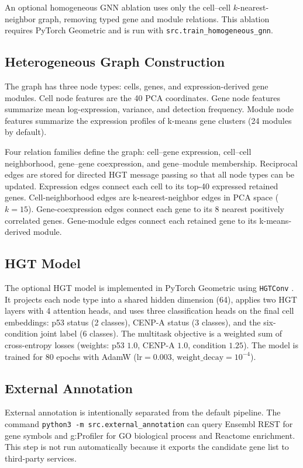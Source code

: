 An optional homogeneous GNN ablation uses only the cell--cell $k$-nearest-neighbor
graph, removing typed gene and module relations.
This ablation requires PyTorch Geometric and is run with
\texttt{src.train\_homogeneous\_gnn}.

\subsection{Heterogeneous Graph Construction}

The graph has three node types: cells, genes, and expression-derived gene modules.
Cell node features are the 40 PCA coordinates.
Gene node features summarize mean log-expression, variance, and detection frequency.
Module node features summarize the expression profiles of k-means gene clusters
(24 modules by default).

Four relation families define the graph: cell--gene expression, cell--cell
neighborhood, gene--gene coexpression, and gene--module membership.
Reciprocal edges are stored for directed HGT message passing so that all node
types can be updated.
Expression edges connect each cell to its top-40 expressed retained genes.
Cell-neighborhood edges are k-nearest-neighbor edges in PCA space ($k=15$).
Gene-coexpression edges connect each gene to its 8 nearest positively correlated
genes.
Gene-module edges connect each retained gene to its k-means-derived module.

\subsection{HGT Model}

The optional HGT model is implemented in PyTorch Geometric using \texttt{HGTConv}
\citep{pyg_hgtconv,pyg_heterodata}.
It projects each node type into a shared hidden dimension (64), applies two HGT
layers with 4 attention heads, and uses three classification heads on the final
cell embeddings: p53 status (2 classes), CENP-A status (3 classes), and the
six-condition joint label (6 classes).
The multitask objective is a weighted sum of cross-entropy losses
(weights: p53 $1.0$, CENP-A $1.0$, condition $1.25$).
The model is trained for 80 epochs with AdamW
($\mathrm{lr}=0.003$, $\mathrm{weight\_decay}=10^{-4}$).

\subsection{External Annotation}

External annotation is intentionally separated from the default pipeline.
The command \texttt{python3 -m src.external\_annotation} can query Ensembl REST
for gene symbols and g:Profiler for GO biological process and Reactome enrichment.
This step is not run automatically because it exports the candidate gene list to
third-party services.
